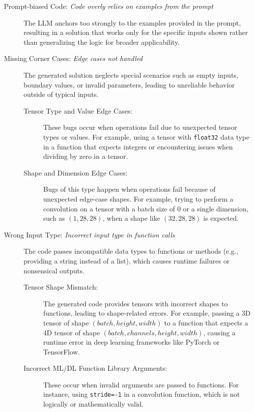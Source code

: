 \begin{description}
\item[Prompt-biased Code: \textit{Code overly relies on examples from the prompt}]
The LLM anchors too strongly to the examples provided in the prompt, resulting in a solution that works only for the specific inputs shown rather than generalizing the logic for broader applicability.

\item[Missing Corner Cases: \textit{Edge cases not handled}]
The generated solution neglects special scenarios such as empty inputs, boundary values, or invalid parameters, leading to unreliable behavior outside of typical inputs.

\begin{description}
    

    \item[Tensor Type and Value Edge Cases:] These bugs occur when operations fail due to unexpected tensor types or values. For example, using a tensor with \texttt{float32} data type in a function that expects integers or encountering issues when dividing by zero in a tensor.
    
    \item[Shape and Dimension Edge Cases:] Bugs of this type happen when operations fail because of unexpected edge-case shapes. For example, trying to perform a convolution on a tensor with a batch size of $0$ or a single dimension, such as $(1, 28, 28)$, when a shape like $(32, 28, 28)$ is expected.
\end{description}

\item[Wrong Input Type: \textit{Incorrect input type in function calls}]
The code passes incompatible data types to functions or methods (e.g., providing a string instead of a list), which causes runtime failures or nonsensical outputs.

\begin{description}
    \item[Tensor Shape Mismatch:] The generated code provides tensors with incorrect shapes to functions, leading to shape-related errors. For example, passing a 3D tensor of shape $(batch, height, width)$ to a function that expects a 4D tensor of shape $(batch, channels, height, width)$, causing a runtime error in deep learning frameworks like PyTorch or TensorFlow.
    
    \item[Incorrect ML/DL Function Library Arguments:] These occur when invalid arguments are passed to functions. For instance, using \texttt{stride=-1} in a convolution function, which is not logically or mathematically valid.


\end{description}
\end{description}
